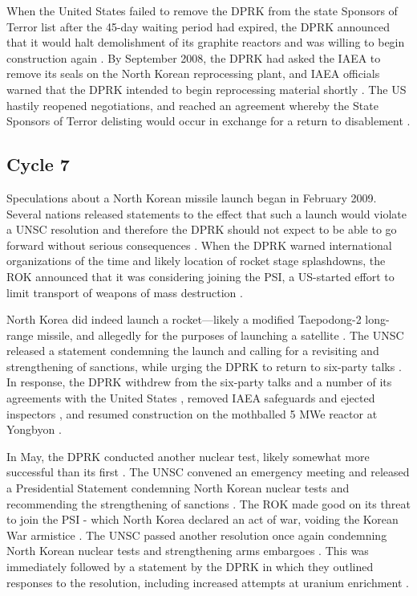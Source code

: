When the United States failed to remove the DPRK from the state Sponsors of Terror list after the 45-day waiting period had expired, the DPRK announced that it would halt demolishment of its graphite reactors and was willing to begin construction again \cite{davenport}. By September 2008, the DPRK had asked the IAEA to remove its seals on the North Korean reprocessing plant, and IAEA officials warned that the DPRK intended to begin reprocessing material shortly \cite{iaea09}. The US hastily reopened negotiations, and reached an agreement whereby the State Sponsors of Terror delisting would occur in exchange for a return to disablement \cite{nti15}.

\subsection{Cycle 7}

Speculations about a North Korean missile launch began in February 2009. Several nations released statements to the effect that such a launch would violate a UNSC resolution and therefore the DPRK should not expect to be able to go forward without serious consequences \cite{davenport}. When the DPRK warned international organizations of the time and likely location of rocket stage splashdowns, the ROK announced that it was considering joining the PSI, a US-started effort to limit transport of weapons of mass destruction \cite{davenport}.

North Korea did indeed launch a rocket---likely a modified Taepodong-2 long-range missile, and allegedly for the purposes of launching a satellite \cite{davenport}. The UNSC released a statement condemning the launch and calling for a revisiting and strengthening of sanctions, while urging the DPRK to return to six-party talks \cite{unsc09}. In response, the DPRK withdrew from the six-party talks and a number of its agreements with the United States \cite{niksch}, removed IAEA safeguards and ejected inspectors \cite{iaea09}, and resumed construction on the mothballed 5 MWe reactor at Yongbyon \cite{nti15}.

In May, the DPRK conducted another nuclear test, likely somewhat more successful than its first \cite{nti15}. The UNSC convened an emergency meeting and released a Presidential Statement condemning North Korean nuclear tests and recommending the strengthening of sanctions \cite{unsc09p}. The ROK made good on its threat to join the PSI - which North Korea declared an act of war, voiding the Korean War armistice \cite{glionna}. The UNSC passed another resolution once again condemning North Korean nuclear tests and strengthening arms embargoes \cite{unsc09j}. This was immediately followed by a statement by the DPRK in which they outlined responses to the resolution, including increased attempts at uranium enrichment \cite{nti15}.

